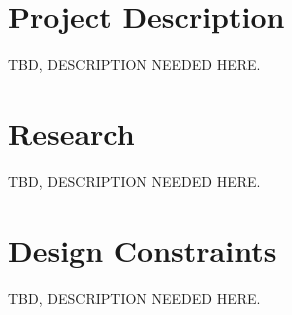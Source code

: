 \documentclass[12pt]{article}
\begin{document}
\section{Project Description}                   %
TBD, DESCRIPTION NEEDED HERE.
\section{Research}                              %
TBD, DESCRIPTION NEEDED HERE.
\section{Design Constraints}                    %
TBD, DESCRIPTION NEEDED HERE.
\end{document}

